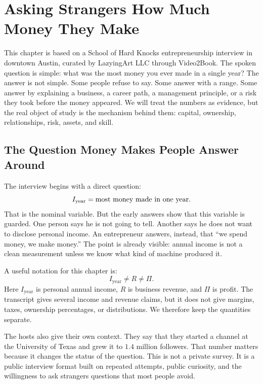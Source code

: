 \chapter{Asking Strangers How Much Money They Make}

This chapter is based on a School of Hard Knocks entrepreneurship interview in downtown Austin, curated by LazyingArt LLC through Video2Book. The spoken question is simple: what was the most money you ever made in a single year? The answer is not simple. Some people refuse to say. Some answer with a range. Some answer by explaining a business, a career path, a management principle, or a risk they took before the money appeared. We will treat the numbers as evidence, but the real object of study is the mechanism behind them: capital, ownership, relationships, risk, assets, and skill.

\section{The Question Money Makes People Answer Around}

The interview begins with a direct question:
\[
I_{\mathrm{year}} = \hbox{most money made in one year}.
\]
That is the nominal variable. But the early answers show that this variable is guarded. One person says he is not going to tell. Another says he does not want to disclose personal income. An entrepreneur answers, instead, that ``we spend money, we make money.'' The point is already visible: annual income is not a clean measurement unless we know what kind of machine produced it.

A useful notation for this chapter is:
\begin{equation}
I_{\mathrm{year}} \neq R \neq \Pi .
\end{equation}
Here \(I_{\mathrm{year}}\) is personal annual income, \(R\) is business revenue, and \(\Pi\) is profit. The transcript gives several income and revenue claims, but it does not give margins, taxes, ownership percentages, or distributions. We therefore keep the quantities separate.

The hosts also give their own context. They say that they started a channel at the University of Texas and grew it to \(1.4\) million followers. That number matters because it changes the status of the question. This is not a private survey. It is a public interview format built on repeated attempts, public curiosity, and the willingness to ask strangers questions that most people avoid.

